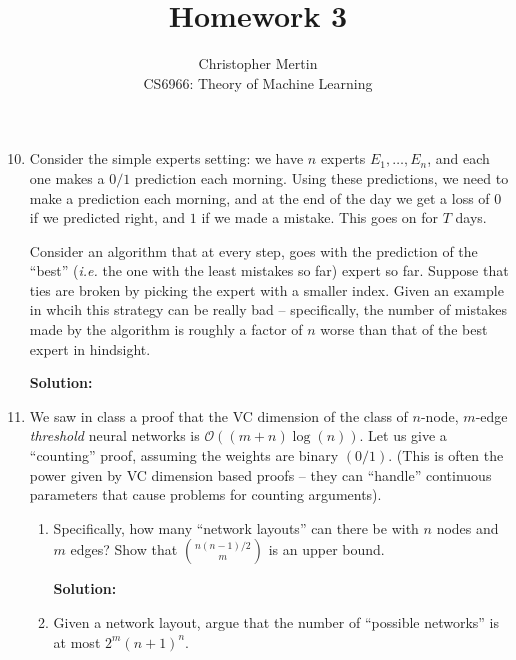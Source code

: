 \documentclass[12pt]{article}
\newcommand{\BigO}[1]{\mathcal{O}\left( #1 \right)}
\begin{document}
 
 
\title{Homework 3}%
\author{Christopher Mertin\\ %
CS6966: Theory of Machine Learning} %
 
\maketitle

\begin{enumerate}
  \setcounter{enumi}{9}
\item Consider the simple experts setting: we have $n$ experts $E_{1}, \ldots, E_{n}$, and each one makes a $0/1$ prediction each morning. Using these predictions, we need to make a prediction each morning, and at the end of the day we get a loss of $0$ if we predicted right, and $1$ if we made a mistake. This goes on for $T$ days.

Consider an algorithm that at every step, goes with the prediction of the ``best'' ({\em i.e.} the one with the least mistakes so far) expert so far. Suppose that ties are broken by picking the expert with a smaller index. Given an example in whcih this strategy can be really bad -- specifically, the number of mistakes made by the algorithm is roughly a factor of $n$ worse than that of the best expert in hindsight. 

{\bf Solution:}

\item We saw in class a proof that the VC dimension of the class of $n$-node, $m$-edge {\em threshold} neural networks is $\BigO{(m+n)\log(n)}$. Let us give a ``counting'' proof, assuming the weights are binary $(0/1)$. (This is often the power given by VC dimension based proofs -- they can ``handle'' continuous parameters that cause problems for counting arguments).

\begin{enumerate}
  \item Specifically, how many ``network layouts'' can there be with $n$ nodes and $m$ edges? Show that ${n(n-1)/2}\choose{m}$ is an upper bound.

   {\bf Solution:}

   \item Given a network layout, argue that the number of ``possible networks'' is at most $2^{m}(n+1)^{n}$. 


\end{enumerate}
\end{enumerate}
\end{document}

